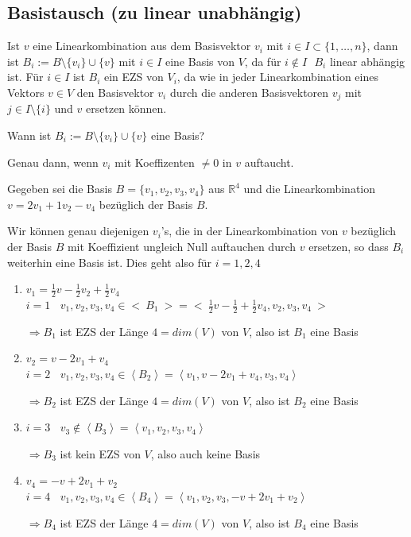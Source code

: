 \documentclass{scrartcl}
\begin{document}
\subsection{Basistausch (zu linear unabhängig)}

Ist $v$ eine Linearkombination aus dem Basisvektor $v_i$ mit $ i \in I \subset \{1, \dots, n\}$, dann ist $B_i := B \setminus \{v_i\} \cup \{v\} $ mit $i \in I$ eine Basis von $V$, da für $i \notin I~~~ B_i$ linear abhängig ist. Für $i \in I$ ist $B_i$ ein EZS von $V_i$, da wie in jeder Linearkombination eines Vektors $v \in V$ den Basisvektor $v_i$ durch die anderen Basisvektoren $v_j $ mit $j \in I \setminus \{i\}$ und $v$ ersetzen können.


\begin{Notiz}
Wann ist $B_i := B \setminus \{v_i\} \cup \{v\} $ eine Basis?

Genau dann, wenn $v_i$ mit Koeffizenten $\neq 0$ in $v$ auftaucht.
\end{Notiz}

\begin{Beispiel}
Gegeben sei die Basis $B = \{v_1, v_2, v_3, v_4\}$ aus $\mathbb{R}^4$ und die Linearkombination $v = 2v_1 + 1v_2 - v_4$ bezüglich der Basis $B$.



Wir können genau diejenigen $v_i$’s, die in der Linearkombination von $v$ bezüglich der Basis
$B$ mit Koeffizient ungleich Null auftauchen durch $v$ ersetzen, so dass $B_i$ weiterhin eine Basis
ist. Dies geht also für $i = 1,2,4$

\begin{enumerate}
\item $v_1 = \frac{1}{2}v - \frac{1}{2}v_2 + \frac{1}{2} v_4$\\
    $i=1~~~~v_1, v_2, v_3, v_4 \in <~B_1~> = <~ \frac{1}{2}v - \frac{1}{2} + \frac{1}{2} v_4, v_2, v_3, v_4 ~>$
    
    
    $\Rightarrow B_1$ ist EZS der Länge $4 = dim(V)$ von $V$, also ist $B_1$ eine Basis
\item $v_2 = v - 2v_1 + v_4$\\
    $i=2~~~~v_1, v_2, v_3, v_4 \in \left< B_2 \right> = \left< v_1, v - 2v_1 + v_4, v_3, v_4 \right>$
    
    
    $\Rightarrow B_2$ ist EZS der Länge $4 = dim(V)$ von $V$, also ist $B_2$ eine Basis
\item $i=3~~~~v_3 \notin \left< B_3 \right> = \left< v_1, v_2, v_3, v_4 \right>$


    $\Rightarrow B_3$ ist kein EZS von $V$, also auch keine Basis
\item $v_4 = -v + 2v_1 + v_2$\\
    $i=4~~~~v_1, v_2, v_3, v_4 \in \left< B_4 \right> = \left< v_1, v_2, v_3, -v + 2v_1 + v_2 \right>$
    
    
    $\Rightarrow B_4$ ist EZS der Länge $4 = dim(V)$ von $V$, also ist $B_4$ eine Basis
\end{enumerate}
\end{Beispiel}
\end{document}
